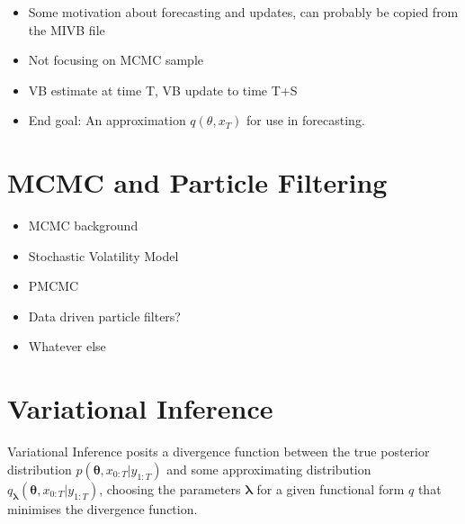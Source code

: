 \documentclass[12pt,a4paper]{article}%
\numberwithin{equation}{section}
\begin{document}
\begin{itemize}
\item Some motivation about forecasting and updates, can probably be copied from the MIVB file
\item Not focusing on MCMC sample
\item VB estimate at time T, VB update to time T+S
\item End goal: An approximation $q(\theta, x_{T})$ for use in forecasting.
\end{itemize}

\section{MCMC and Particle Filtering}
\begin{itemize}
\item MCMC background
\item Stochastic Volatility Model
\item PMCMC
\item Data driven particle filters?
\item Whatever else
\end{itemize}

\citep{Arulampalam2002}

\section{Variational Inference}


Variational Inference posits a divergence function between the true posterior distribution $p(\boldsymbol{\theta}, x_{0:T} | y_{1:T})$ and some approximating distribution $q_{\boldsymbol{\lambda}}(\boldsymbol{\theta}, x_{0:T} | y_{1:T})$, choosing the parameters $\boldsymbol{\lambda}$ for a given functional form $q$ that minimises the divergence function.
\end{document}

